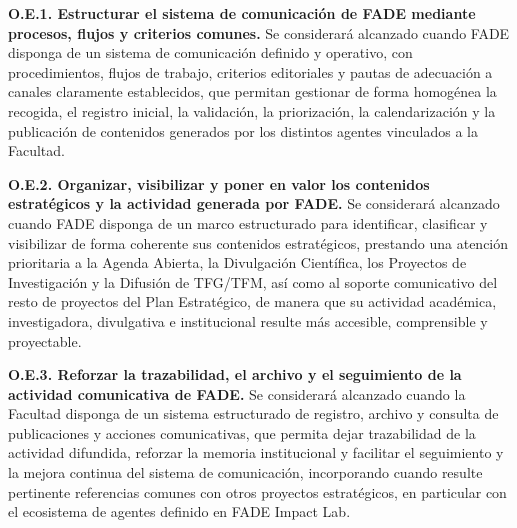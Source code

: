 \documentclass[11pt,a4paper]{scrreprt}
\begin{document}
\textbf{O.E.1. Estructurar el sistema de comunicación de FADE mediante procesos, flujos y criterios comunes.} Se considerará alcanzado cuando FADE disponga de un sistema de comunicación definido y operativo, con procedimientos, flujos de trabajo, criterios editoriales y pautas de adecuación a canales claramente establecidos, que permitan gestionar de forma homogénea la recogida, el registro inicial, la validación, la priorización, la calendarización y la publicación de contenidos generados por los distintos agentes vinculados a la Facultad.

\textbf{O.E.2. Organizar, visibilizar y poner en valor los contenidos estratégicos y la actividad generada por FADE.} Se considerará alcanzado cuando FADE disponga de un marco estructurado para identificar, clasificar y visibilizar de forma coherente sus contenidos estratégicos, prestando una atención prioritaria a la Agenda Abierta, la Divulgación Científica, los Proyectos de Investigación y la Difusión de TFG/TFM, así como al soporte comunicativo del resto de proyectos del Plan Estratégico, de manera que su actividad académica, investigadora, divulgativa e institucional resulte más accesible, comprensible y proyectable.

\textbf{O.E.3. Reforzar la trazabilidad, el archivo y el seguimiento de la actividad comunicativa de FADE.} Se considerará alcanzado cuando la Facultad disponga de un sistema estructurado de registro, archivo y consulta de publicaciones y acciones comunicativas, que permita dejar trazabilidad de la actividad difundida, reforzar la memoria institucional y facilitar el seguimiento y la mejora continua del sistema de comunicación, incorporando cuando resulte pertinente referencias comunes con otros proyectos estratégicos, en particular con el ecosistema de agentes definido en FADE Impact Lab.
\end{document}
